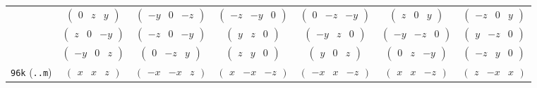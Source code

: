 \documentclass[fleqn,9pt,landscape]{jsarticle}
\begin{document}
\begin{center}
\begin{longtable}{ccccccc}
& $ \begin{pmatrix} 0 & z & y \end{pmatrix} $ & $ \begin{pmatrix} - y & 0 & - z \end{pmatrix} $ & $ \begin{pmatrix} - z & - y & 0 \end{pmatrix} $ & $ \begin{pmatrix} 0 & - z & - y \end{pmatrix} $ & $ \begin{pmatrix} z & 0 & y \end{pmatrix} $ & $ \begin{pmatrix} - z & 0 & y \end{pmatrix} $ \\
& $ \begin{pmatrix} z & 0 & - y \end{pmatrix} $ & $ \begin{pmatrix} - z & 0 & - y \end{pmatrix} $ & $ \begin{pmatrix} y & z & 0 \end{pmatrix} $ & $ \begin{pmatrix} - y & z & 0 \end{pmatrix} $ & $ \begin{pmatrix} - y & - z & 0 \end{pmatrix} $ & $ \begin{pmatrix} y & - z & 0 \end{pmatrix} $ \\
& $ \begin{pmatrix} - y & 0 & z \end{pmatrix} $ & $ \begin{pmatrix} 0 & - z & y \end{pmatrix} $ & $ \begin{pmatrix} z & y & 0 \end{pmatrix} $ & $ \begin{pmatrix} y & 0 & z \end{pmatrix} $ & $ \begin{pmatrix} 0 & z & - y \end{pmatrix} $ & $ \begin{pmatrix} - z & y & 0 \end{pmatrix} $ \\ \hline
{\tt 96k} ({\tt ..m}) & $ \begin{pmatrix} x & x & z \end{pmatrix} $ & $ \begin{pmatrix} - x & - x & z \end{pmatrix} $ & $ \begin{pmatrix} x & - x & - z \end{pmatrix} $ & $ \begin{pmatrix} - x & x & - z \end{pmatrix} $ & $ \begin{pmatrix} x & x & - z \end{pmatrix} $ & $ \begin{pmatrix} z & - x & x \end{pmatrix} $ \\

\end{longtable}
\end{center}
\end{document}

